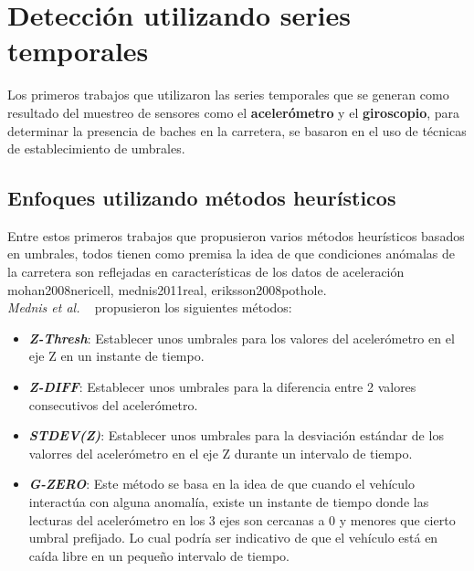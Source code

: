 
\section{Detección utilizando series temporales}
	Los primeros trabajos que utilizaron las series temporales que se generan como resultado del muestreo de sensores como el \textbf
	{acelerómetro} y el \textbf{giroscopio}, para determinar la presencia de baches en la carretera, se basaron en el uso de técnicas
	de establecimiento de umbrales.\\

	\subsection{Enfoques utilizando métodos heurísticos}
		Entre estos primeros trabajos que propusieron varios métodos heurísticos basados en umbrales, todos tienen como premisa
		la idea de que condiciones anómalas de la carretera son reflejadas en características de los datos de aceleración \brackcite
		{mohan2008nericell, mednis2011real, eriksson2008pothole}.\\

		\emph{Mednis et al.} ~ propusieron los siguientes métodos:\\

		\begin{itemize}
			\item  \emph{\textbf {Z-Thresh}}: Establecer unos umbrales para los valores del acelerómetro en el eje Z en un instante de tiempo.\\
			\item \emph{\textbf {Z-DIFF}}: Establecer unos umbrales para la diferencia entre 2 valores consecutivos del acelerómetro.\\
			\item \emph{\textbf {STDEV(Z)}}: Establecer unos umbrales para la desviación estándar de los valorres del acelerómetro en
				el eje Z durante un intervalo de tiempo.\\ 
			\item \emph{\textbf {G-ZERO}}: Este método se basa en la idea de que cuando el vehículo interactúa con alguna anomalía, existe un
				instante de tiempo donde las lecturas del acelerómetro en los 3 ejes son cercanas a 0 y menores que cierto umbral prefijado. Lo 
				cual podría ser indicativo de que el vehículo está en caída libre en un pequeño intervalo de tiempo.
		\end{itemize}

